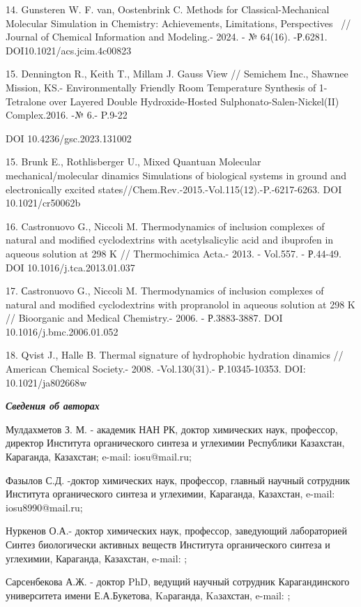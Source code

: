 14. Gunsteren W. F. van, Oostenbrink C. Methods for Classical-Mechanical
Molecular Simulation in Chemistry: Achievements, Limitations,
Perspectives~ // Journal of Chemical Information and Modeling.- 2024. -
№ 64(16). -Р.6281. DOI10.1021/acs.jcim.4c00823

15. Dennington R., Keith T., Millam J. Gauss View // Semichem Inc.,
Shawnee Mission, KS.- Environmentally Friendly Room Temperature
Synthesis of 1-Tetralone over Layered Double Hydroxide-Hosted
Sulphonato-Salen-Nickel(II) Complex.2016. -№ 6.- P.9-22

DOI 10.4236/gsc.2023.131002

15. Brunk E., Rothlisberger U., Mixed Quantuan Molecular
mechanical/molecular dinamics Simulations of biological systems in
ground and electronically excited
states//Chem.Rev.-2015.-Vol.115(12).-P.-6217-6263. DOI 10.1021/cr50062b

16. Castronuovo G., Niccoli M. Thermodynamics of inclusion complexes of
natural and modified cyclodextrins with acetylsalicylic acid and
ibuprofen in aqueous solution at 298 K // Thermochimica Acta.- 2013. -
Vol.557. - Р.44-49. DOI 10.1016/j.tca.2013.01.037~

17. Сastronuovo G., Niccoli M. Thermodynamics of inclusion complexes of
natural and modified cyclodextrins with propranolol in aqueous solution
at 298 K // Bioorganic and Medical Chemistry.- 2006. - Р.3883-3887. DOI
10.1016/j.bmc.2006.01.052

18. Qvist J., Halle B. Thermal signature of hydrophobic hydration
dinamics // American Chemical Society.- 2008. -Vol.130(31).-
Р.10345-10353. DOI: 10.1021/ja802668w

\emph{{\bfseries Сведения об авторах}}

Мулдахметов З. М. - академик НАН РК, доктор химических наук, профессор,
директор Института органического синтеза и углехимии Республики
Казахстан, Караганда, Казахстан; e-mail: iosu@mail.ru;

Фазылов С.Д. -доктор химических наук, профессор, главный
научный сотрудник Института органического синтеза и углехимии,
Караганда, Казахстан, e-mail: iosu8990@mail.ru;

Нуркенов О.А.- доктор химических наук, профессор, заведующий
лабораторией Синтез биологически активных веществ Института
органического синтеза и углехимии, Караганда, Казахстан, e-mail:
\href{mailto:nurkenov_oral@mail.ru}{};

Сарсенбекова А.Ж. - доктор PhD, ведущий научный сотрудник
Карагандинского университета имени Е.А.Букетова, Kaраганда, Kaзахстан,
e-mail: \href{mailto:chem_akmaral@mail.ru}{};

